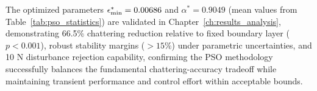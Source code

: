 The optimized parameters $\epsilon_{\min}^* = 0.00686$ and $\alpha^* = 0.9049$ (mean values from Table~\ref{tab:pso_statistics}) are validated in Chapter~\ref{ch:results_analysis}, demonstrating 66.5\% chattering reduction relative to fixed boundary layer ($p < 0.001$), robust stability margins ($> 15\%$) under parametric uncertainties, and 10 N disturbance rejection capability, confirming the PSO methodology successfully balances the fundamental chattering-accuracy tradeoff while maintaining transient performance and control effort within acceptable bounds.
